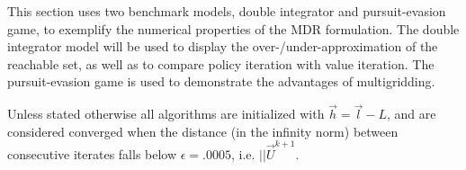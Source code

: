 This section uses two benchmark models, double integrator and pursuit-evasion game, to exemplify the numerical properties of the MDR formulation. The double integrator model will be used to display the over-/under-approximation of the reachable set, as well as to compare policy iteration with value iteration. The pursuit-evasion game is used to demonstrate the advantages of multigridding. 

Unless stated otherwise all algorithms are initialized with $\vec{h}=\vec{l}-L$, and are considered converged when the distance (in the infinity norm) between consecutive iterates falls below $\epsilon =.0005$, i.e. $||\vec{U}^{k+1}$.




